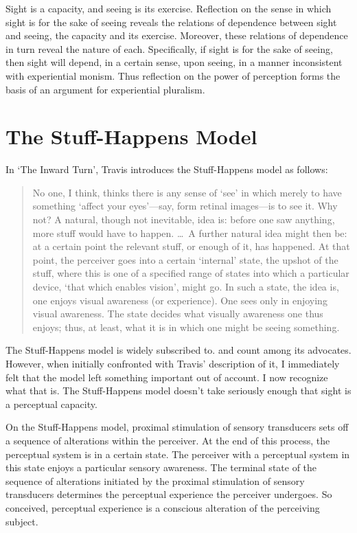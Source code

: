 \documentclass[12pt]{article}
\begin{document}
Sight is a capacity, and seeing is its exercise. Reflection on the sense in which sight is for the sake of seeing reveals the relations of dependence between sight and seeing, the capacity and its exercise. Moreover, these relations of dependence in turn reveal the nature of each. Specifically, if sight is for the sake of seeing, then sight will depend, in a certain sense, upon seeing, in a manner inconsistent with experiential monism. Thus reflection on the power of perception forms the basis of an argument for experiential pluralism.


\section{The Stuff-Happens Model} %
\label{sec:the_stuff_happens_model}

In `The Inward Turn', Travis introduces the Stuff-Happens model as follows:
\begin{quote}
    No one, I think, thinks there is any sense of ‘see’ in which merely to have something `affect your eyes'---say, form retinal images---is to see it. Why not? A natural, though not inevitable, idea is: before one saw anything, more stuff would have to happen. \ldots\ A further natural idea might then be: at a certain point the relevant stuff, or enough of it, has happened. At that point, the perceiver goes into a certain `internal' state, the upshot of the stuff, where this is one of a specified range of states into which a particular device, `that which enables vision', might go. In such a state, the idea is, one enjoys visual awareness (or experience). One sees only in enjoying visual awareness. The state decides what visually awareness one thus enjoys; thus, at least, what it is in which one might be seeing something. \citep[315]{Travis:2009fk}
\end{quote}
The Stuff-Happens model is widely subscribed to. \citet{Evans:1982ly} and \citet{Burge:2010uq} count among its advocates. However, when initially confronted with Travis' description of it, I immediately felt that the model left something important out of account. I now recognize what that is. The Stuff-Happens model doesn't take seriously enough that sight is a perceptual capacity.

On the Stuff-Happens model, proximal stimulation of sensory transducers sets off a sequence of alterations within the perceiver. At the end of this process, the perceptual system is in a certain state. The perceiver with a perceptual system in this state enjoys a particular sensory awareness. The terminal state of the sequence of alterations initiated by the proximal stimulation of sensory transducers determines the perceptual experience the perceiver undergoes. So conceived, perceptual experience is a conscious alteration of the perceiving subject.
\end{document}
